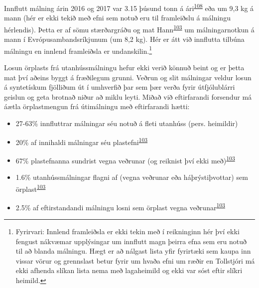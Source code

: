 \documentclass[icelandic,]{book}
\providecommand{\tightlist}{%
  \setlength{\itemsep}{0pt}\setlength{\parskip}{0pt}}
\let\rmarkdownfootnote\footnote%
\def\footnote{\protect\rmarkdownfootnote}
\begin{document}
Innflutt málning árin 2016 og 2017 var 3.15 þúsund tonn á ári\textsuperscript{\protect\hyperlink{ref-tollur2017}{108}} eða um 9,3 kg á mann (hér er ekki tekið með efni sem notuð eru til framleiðslu á málningu hérlendis). Þetta er af sömu stærðargráðu og mat Hann\textsuperscript{\protect\hyperlink{ref-Hann2018}{103}} um málningarnotkun á mann í Evrópusambandsríkjunum (um 8,2 kg). Hér er átt við innflutta tilbúna málningu en innlend framleiðsla er undanskilin.\footnote{Fyrirvari: Innlend framleiðsla er ekki tekin með í reikninginn hér því ekki fengust nákvæmar upplýsingar um innflutt magn þeirra efna sem eru notuð til að blanda málningu. Hægt er að nálgast lista yfir fyrirtæki sem kaupa inn vissar vörur og grennslast betur fyrir um hvaða efni um ræðir en Tollstjóri má ekki afhenda slíkan lista nema með lagaheimild og ekki var sóst eftir slíkri heimild.}

Losun örplasts frá utanhússmálningu hefur ekki verið könnuð beint og er þetta mat því aðeins byggt á fræðilegum grunni. Veðrun og slit málningar veldur losun á syntetískum fjölliðum út í umhverfið þar sem þær verða fyrir útfjólublárri geislun og geta brotnað niður að miklu leyti. Miðað við eftirfarandi forsendur má áætla örplastmengun frá útimálningu með eftirfarandi hætti:

\begin{itemize}
\tightlist
\item
  27-63\% innfluttrar málningar séu notuð á fleti utanhúss (pers. heimildir)
\item
  20\% af innihaldi málningar séu plastefni\textsuperscript{\protect\hyperlink{ref-Hann2018}{103}}
\item
  67\% plastefnanna sundrist vegna veðrunar (og reiknist því ekki með)\textsuperscript{\protect\hyperlink{ref-Hann2018}{103}}
\item
  1.6\% utanhússmálningar flagni af (vegna veðrunar eða háþrýstiþvottar) sem örplast\textsuperscript{\protect\hyperlink{ref-Hann2018}{103}}
\item
  2.5\% af eftirstandandi málningu losni sem örplast vegna veðrunar\textsuperscript{\protect\hyperlink{ref-Hann2018}{103}}
\end{itemize}
\end{document}
